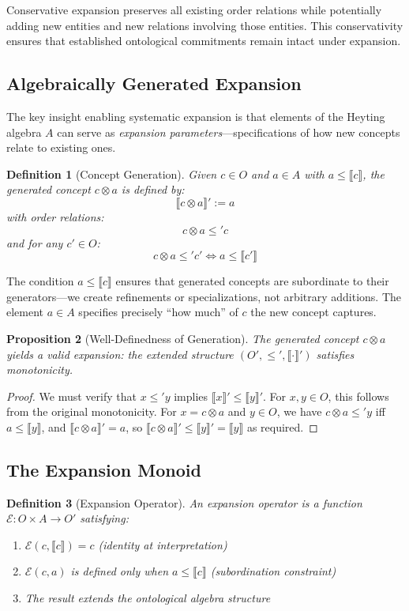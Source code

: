 \documentclass[12pt,a4paper]{article}
\newtheorem{definition}{Definition}[section]
\newtheorem{proposition}[definition]{Proposition}
\newcommand{\sem}[1]{\llbracket #1 \rrbracket}
\begin{document}
Conservative expansion preserves all existing order relations while potentially adding new entities and new relations involving those entities. This conservativity ensures that established ontological commitments remain intact under expansion.

\subsection{Algebraically Generated Expansion}

The key insight enabling systematic expansion is that elements of the Heyting algebra $A$ can serve as \emph{expansion parameters}---specifications of how new concepts relate to existing ones.

\begin{definition}[Concept Generation]
Given $c \in O$ and $a \in A$ with $a \leq \sem{c}$, the \emph{generated concept} $c \otimes a$ is defined by:
$$
\sem{c \otimes a}' := a
$$
with order relations:
$$
c \otimes a \leq' c
$$
and for any $c' \in O$:
$$
c \otimes a \leq' c' \iff a \leq \sem{c'}
$$
\end{definition}

The condition $a \leq \sem{c}$ ensures that generated concepts are subordinate to their generators---we create refinements or specializations, not arbitrary additions. The element $a \in A$ specifies precisely ``how much'' of $c$ the new concept captures.

\begin{proposition}[Well-Definedness of Generation]
The generated concept $c \otimes a$ yields a valid expansion: the extended structure $(O', \leq', \sem{\cdot}')$ satisfies monotonicity.
\end{proposition}

\begin{proof}
We must verify that $x \leq' y$ implies $\sem{x}' \leq \sem{y}'$. For $x, y \in O$, this follows from the original monotonicity. For $x = c \otimes a$ and $y \in O$, we have $c \otimes a \leq' y$ iff $a \leq \sem{y}$, and $\sem{c \otimes a}' = a$, so $\sem{c \otimes a}' \leq \sem{y}' = \sem{y}$ as required.
\end{proof}

\subsection{The Expansion Monoid}

\begin{definition}[Expansion Operator]
An \emph{expansion operator} is a function $\mathcal{E} : O \times A \to O'$ satisfying:
\begin{enumerate}
    \item $\mathcal{E}(c, \sem{c}) = c$ (identity at interpretation)
    \item $\mathcal{E}(c, a)$ is defined only when $a \leq \sem{c}$ (subordination constraint)
    \item The result extends the ontological algebra structure
\end{enumerate}
\end{definition}
\end{document}
